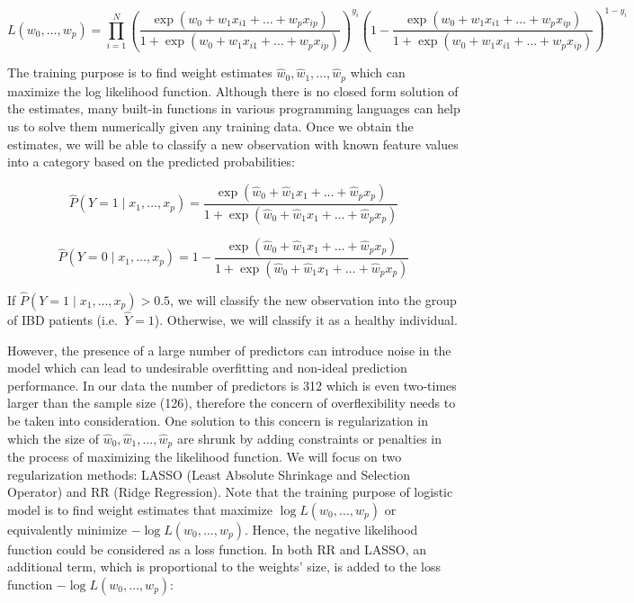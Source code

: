 \documentclass[preprint, 3p,
authoryear]{elsarticle} %
\begin{document}
\[
L\left(w_{0}, \ldots, w_{p}\right)=\prod_{i=1}^{N}\left(\frac{\exp \left(w_{0}+w_{1} x_{i 1}+\ldots+w_{p} x_{i p}\right)}{1+\exp \left(w_{0}+w_{1} x_{i 1}+\ldots+w_{p} x_{i p}\right)}\right)^{y_{i}}\left(1-\frac{\exp \left(w_{0}+w_{1} x_{i 1}+\ldots+w_{p} x_{i p}\right)}{1+\exp \left(w_{0}+w_{1} x_{i 1}+\ldots+w_{p} x_{i p}\right)}\right)^{1-y_{i}}
\]

The training purpose is to find weight estimates
\(\hat{w}_{0}, \hat{w}_{1}, \ldots, \hat{w}_{p}\) which can maximize the
log likelihood function. Although there is no closed form solution of
the estimates, many built-in functions in various programming languages
can help us to solve them numerically given any training data. Once we
obtain the estimates, we will be able to classify a new observation with
known feature values into a category based on the predicted
probabilities:

\[
\hat{P}\left(Y=1 \mid x_{1}, \ldots, x_{p}\right)=\frac{\exp \left(\hat{w}_{0}+\hat{w}_{1} x_{1}+\ldots+\hat{w}_{p} x_{p}\right)}{1+\exp \left(\hat{w}_{0}+\hat{w}_{1} x_{1}+\ldots+\hat{w}_{p} x_{p}\right)}
\]

\[
\hat{P}\left(Y=0 \mid x_{1}, \ldots, x_{p}\right)=1-\frac{\exp \left(\hat{w}_{0}+\hat{w}_{1} x_{1}+\ldots+\hat{w}_{p} x_{p}\right)}{1+\exp \left(\hat{w}_{0}+\hat{w}_{1} x_{1}+\ldots+\hat{w}_{p} x_{p}\right)}
\]

If \(\hat{P}\left(Y=1 \mid x_{1}, \ldots, x_{p}\right)>0.5\), we will
classify the new observation into the group of IBD patients
(i.e.~\(\hat{Y}=1\)). Otherwise, we will classify it as a healthy
individual.

However, the presence of a large number of predictors can introduce
noise in the model which can lead to undesirable overfitting and
non-ideal prediction performance. In our data the number of predictors
is 312 which is even two-times larger than the sample size (126),
therefore the concern of overflexibility needs to be taken into
consideration. One solution to this concern is regularization in which
the size of \(\hat{w}_{0}, \hat{w}_{1}, \ldots, \hat{w}_{p}\) are shrunk
by adding constraints or penalties in the process of maximizing the
likelihood function. We will focus on two regularization methods: LASSO
(Least Absolute Shrinkage and Selection Operator) and RR (Ridge
Regression). Note that the training purpose of logistic model is to find
weight estimates that maximize
\(\log L\left(w_{0}, \ldots, w_{p}\right)\) or equivalently minimize
\(-\log L\left(w_{0}, \ldots, w_{p}\right)\). Hence, the negative
likelihood function could be considered as a loss function. In both RR
and LASSO, an additional term, which is proportional to the weights'
size, is added to the loss function
\(-\log L\left(w_{0}, \ldots, w_{p}\right)\):
\end{document}
